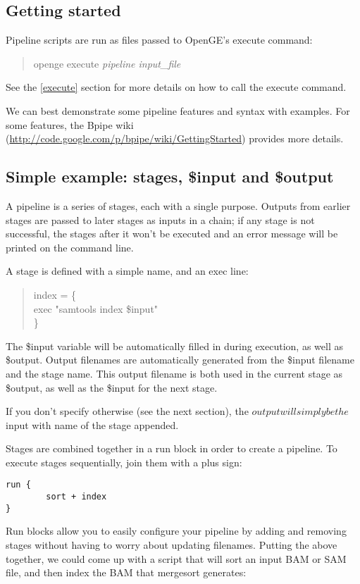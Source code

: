 \documentclass[11pt]{article}
\newcommand {\cmd}[1] {\begin{quote}#1\end{quote}}
\begin{document}
\subsection {Getting started}
Pipeline scripts are run as files passed to OpenGE's execute command:

\cmd{openge execute \textit{pipeline input\_file}}

See the \ref{execute} section for more details on how to call the execute command.

We can best demonstrate some pipeline features and syntax with examples. For some features, the Bpipe wiki (\url{http://code.google.com/p/bpipe/wiki/GettingStarted}) provides more details.

\subsection {Simple example: stages, \$input and \$output}
A pipeline is  a series of stages, each with a single purpose. Outputs from earlier stages are passed to later stages as inputs in a chain; if any stage is not successful, the stages after it won't be executed and an error message will be printed on the command line.

A stage is defined with a simple name, and an exec line:
\cmd{
index = \{\\
\indent exec "samtools index \$input"\\
\}}

The \$input variable will be automatically filled in during execution, as well as \$output. Output filenames are automatically generated from the \$input filename and the stage name. This output filename is both used in the current stage as \$output, as well as the \$input for the next stage.

If you don't specify otherwise (see the next section), the $output will simply be the $input with name of the stage appended.

Stages are combined together in a run block in order to create a pipeline. To execute stages sequentially, join them with a plus sign:
\begin{verbatim}
run {
        sort + index
}
\end{verbatim}
Run blocks allow you to easily configure your pipeline by adding and removing stages without having to worry about updating filenames. Putting the above together, we could come up with a script that will sort an input BAM or SAM file, and then index the BAM that mergesort generates:
\end{document}
